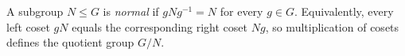 
A subgroup $N\le G$ is \emph{normal} if $gNg^{-1}=N$ for every $g\in G$. Equivalently, every left coset $gN$ equals the corresponding right coset $Ng$, so multiplication of cosets defines the quotient group $G/N$.
